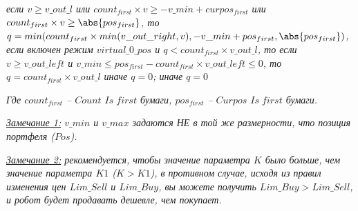 \begin{itemize}
\begin{itemize}
			\textit{если $v \geq v\_out\_l$ или $count_{first} \times v \geq -v\_min + curpos_{first}$ или $count_{first} \times v \geq \abs{pos_{first}}$, то
			$q=min(count_{first} \times min(v\_out\_right, v), -v\_min + pos_{first}, \abs{pos_{first}})$, если включен режим $virtual\_0\_pos$ и
			$q < count_{first} \times v\_out\_l$, то если $v \geq v\_out\_left$ и $v\_min \leq pos_{first} - count_{first} \times v\_out\_left \leq 0$, то
			$q = count_{first} \times v\_out\_l$ иначе $q=0$; иначе $q=0$}
	\end{itemize}
\end{itemize}
\textit{Где $count_{first}$ -- $Count$ $Is \; first$ бумаги, $pos_{first}$ -- $Curpos$ $Is \; first$ бумаги.\newline}




\noindent\label{comment1}\textit{\underline{Замечание 1:} $v\_min$ и $v\_max$ задаются НЕ в той же размерности, что позиция портфеля ($Pos$).\newline}

\noindent\label{comment2}\textit{\underline{Замечание 2:} рекомендуется, чтобы значение параметра $K$ было больше, чем значение параметра $K1$ ($K > K1$), в противном случае,
исходя из правил изменения цен $Lim\_Sell$ и $Lim\_Buy$, вы можете получить $Lim\_Buy > Lim\_Sell$, и робот будет продавать дешевле, чем покупает.}

